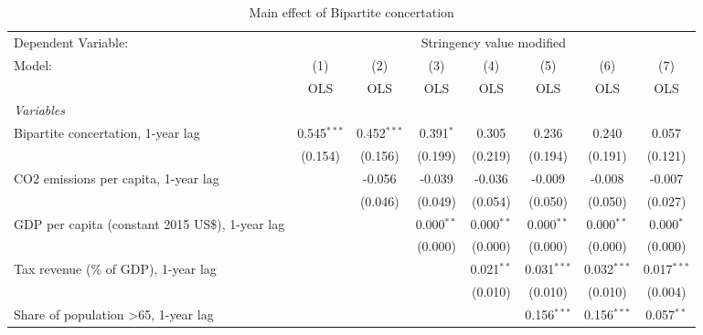 
\begin{table}[htbp]
   \caption{Main effect of Bipartite concertation}
   \centering
   \begin{tabular}{lccccccc}
      \toprule
      Dependent Variable: & \multicolumn{7}{c}{Stringency value modified}\\
      Model:                                                & (1)           & (2)           & (3)          & (4)          & (5)           & (6)           & (7)\\  
                                                            &  OLS          & OLS           & OLS          & OLS          & OLS           & OLS           & OLS\\  
      \midrule
      \emph{Variables}\\
      Bipartite concertation, 1-year lag                    & 0.545$^{***}$ & 0.452$^{***}$ & 0.391$^{*}$  & 0.305        & 0.236         & 0.240         & 0.057\\   
                                                            & (0.154)       & (0.156)       & (0.199)      & (0.219)      & (0.194)       & (0.191)       & (0.121)\\   
      CO2 emissions per capita, 1-year lag                  &               & -0.056        & -0.039       & -0.036       & -0.009        & -0.008        & -0.007\\   
                                                            &               & (0.046)       & (0.049)      & (0.054)      & (0.050)       & (0.050)       & (0.027)\\   
      GDP per capita (constant 2015 US\$), 1-year lag       &               &               & 0.000$^{**}$ & 0.000$^{**}$ & 0.000$^{**}$  & 0.000$^{**}$  & 0.000$^{*}$\\   
                                                            &               &               & (0.000)      & (0.000)      & (0.000)       & (0.000)       & (0.000)\\   
      Tax revenue (\% of GDP), 1-year lag                   &               &               &              & 0.021$^{**}$ & 0.031$^{***}$ & 0.032$^{***}$ & 0.017$^{***}$\\   
                                                            &               &               &              & (0.010)      & (0.010)       & (0.010)       & (0.004)\\   
      Share of population >65, 1-year lag                   &               &               &              &              & 0.156$^{***}$ & 0.156$^{***}$ & 0.057$^{**}$\\   

\end{tabular}
\end{table}

